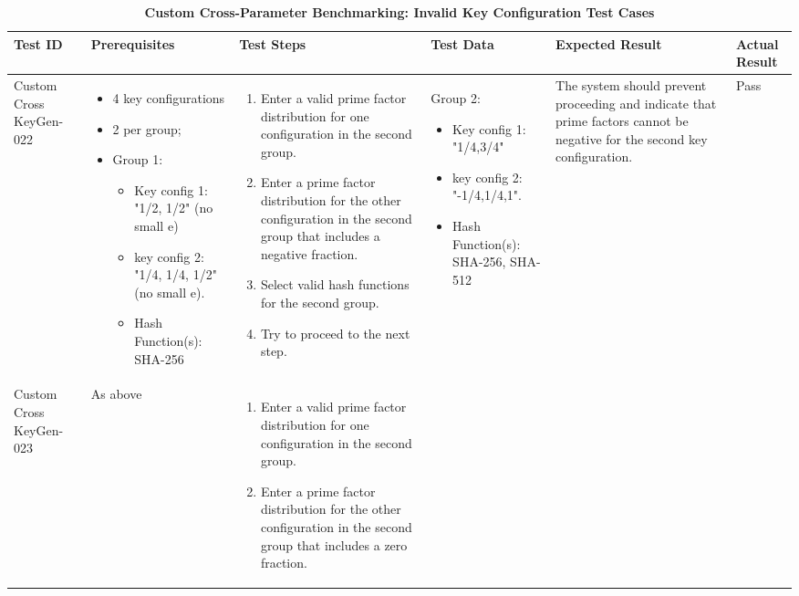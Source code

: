 \documentclass[]{final_report}
\theoremstyle{definition}
\begin{document}
\begin{longtable}{|p{1.5cm}|p{2.5cm}|p{3.5cm}|p{2.5cm}|p{3cm}|p{2cm}|}
  \caption{\textbf{Custom Cross-Parameter Benchmarking: Invalid Key Configuration Test Cases}} \\
  \hline
  \textbf{Test ID} & \textbf{Prerequisites} & \textbf{Test Steps} & \textbf{Test Data} & \textbf{Expected Result} & \textbf{Actual Result} \\
  \hline
  Custom
  Cross
  KeyGen-022 &   
   \begin{itemize}
  \item 4 key configurations
  \item 2 per group; 
  \item Group 1: 
    \begin{itemize}
 \item Key config 1: "1/2, 1/2" (no small e) 
 \item key config 2:  "1/4,
 1/4,
 1/2" (no small e). 
 \item Hash Function(s): SHA-256
    \end{itemize} 
     \end{itemize}    & 
  \begin{enumerate}
    \item Enter a valid prime factor distribution for one configuration in the second group.
    \item Enter a prime factor distribution for the other configuration in the second group that includes a negative fraction.
    \item Select valid hash functions for the second group.
    \item Try to proceed to the next step.
  \end{enumerate} & 
Group 2: 
    \begin{itemize}
 \item Key config 1: "1/4,3/4"
 \item key config 2:  "-1/4,1/4,1". 
 \item Hash Function(s): SHA-256, SHA-512
  \end{itemize}
   & The system should prevent proceeding and indicate that prime factors cannot be negative for the second key configuration. & Pass \\
  \hline
 Custom
 Cross
 KeyGen-023 & As above & 
  \begin{enumerate}
    \item Enter a valid prime factor distribution for one configuration in the second group.
    \item Enter a prime factor distribution for the other configuration in the second group that includes a zero fraction.

\end{enumerate}
\end{longtable}
\end{document}
